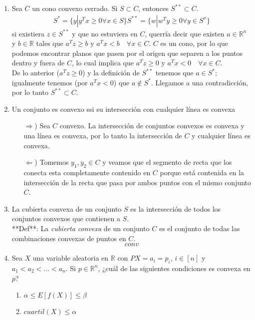 \begin{enumerate}

\item Sea $C$ un cono convexo cerrado. Si $S \subset C$, entonces $S^{**} \subset C$.
\begin{eqnarray*}
S^*=\{y | y^Tx \geq 0 \forall x \in S\}
S^{**}=\{w | w^Ty \geq 0 \forall y \in S^x\}
\end{eqnarray*}
si existiera $z \in S^{**}$ y que no estuviera en $C$, querría decir que existen $a \in \mathbb{R}^n$ y $b \in \mathbb{R}$ tales que $a^Tz \geq b$ y $a^Tx<b \quad \forall x \in C$. $C$ es un cono, por lo que podemos encontrar planos que pasen por el origen que separen a los puntos dentro y fuera de $C$, lo cual implica que $a^Tz \geq 0$ y $a^Tx<0 \quad \forall x \in C$. \\
De lo anterior ($a^Tz \geq 0$) y la definición de $S^{**}$ tenemos que $a \in S^*$; igualmente tenemos (por $a^Tx<0$) que $a \not\in S^*$. Llegamos a una contradicción, por lo tanto $S^{**} \subset C$.

\item Un conjunto es convexo ssi su intersección con cualquier línea es convexa
\begin{itemize}
\item [$\Rightarrow$)] Sea $C$ convexo. La intersección de conjuntos convexos es convexa y una línea es convexa, por lo tanto la intersección de $C$ y cualquier línea es convexa.
\item [$\Leftarrow$)] Tomemos $y_1, y_2 \in C$ y veamos que el segmento de recta que los conecta esta completamente contenido en $C$ porque está contenida en la intersección de la recta que pasa por ambos puntos con el mismo conjunto $C$.
\end{itemize}

\item La cubierta convexa de un conjunto $S$ es la intersección de todos los conjuntos convexos que contienen a $S$. \\
**Def**: La \emph{cubierta convexa} de un conjunto $C$ es el conjunto de todas las combinaciones convexas de puntos en $C$.
$$
conv
$$

\item Sea $X$ una variable aleatoria en $\mathbb{R}$ con $P{X=a_i}=p_i$, $i \in [n]$ y $a_1<a_2<\ldots<a_n$. Si $p \in \mathbb{R}^n$, ¿cuál de las siguientes condiciones es convexa en $p$?
\begin{enumerate}
\item $\alpha \leq E[f(X)] \leq \beta$
\item $cuartil(X) \leq \alpha$
\end{enumerate}


\end{enumerate}
